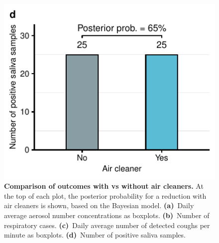 \documentclass[fleqn,11pt]{wlscirep}
\begin{document}
\begin{figure}[!htpb]
    \includegraphics{../../results/mol-data/saliva-by-study-condition.pdf}
    \caption{\textbf{Comparison of outcomes with vs without air cleaners.} At the top of each plot, the posterior probability for a reduction with air cleaners is shown, based on the Bayesian model. \textbf{(a)}~Daily average aerosol number concentrations as boxplots. \textbf{(b)}~Number of respiratory cases. \textbf{(c)}~Daily average number of detected coughs per minute as boxplots. \textbf{(d)}~Number of positive saliva samples.}
    \label{fig:infection-risk}
\end{figure}

\clearpage
\end{document}
